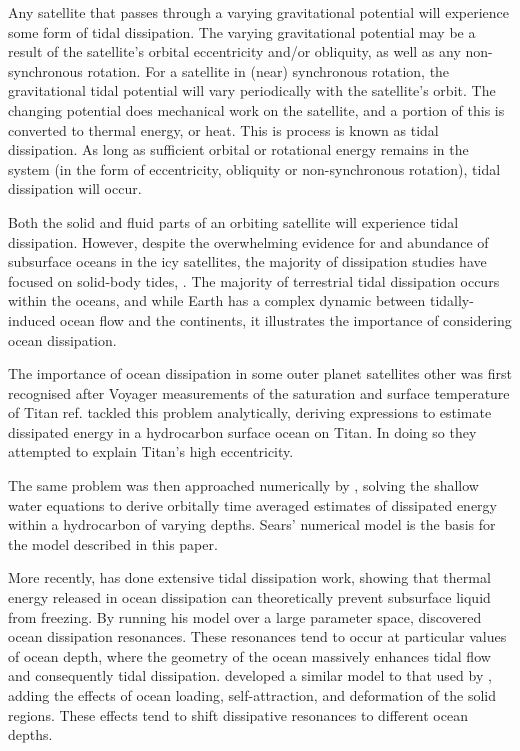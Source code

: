 Any satellite that passes through a varying gravitational potential will experience some form of tidal dissipation. The varying gravitational potential may be a result of the satellite's orbital eccentricity and/or obliquity, as well as any non-synchronous rotation. For a satellite in (near) synchronous rotation, the gravitational tidal potential will vary periodically with the satellite's orbit. The changing potential does mechanical work on the satellite, and a portion of this is converted to thermal energy, or heat. This is process is known as tidal dissipation. As long as sufficient orbital or rotational energy remains in the system (in the form of eccentricity, obliquity or non-synchronous rotation), tidal dissipation will occur.

Both the solid and fluid parts of an orbiting satellite will experience tidal dissipation. 
However, despite the overwhelming evidence for and abundance of subsurface oceans in the icy satellites, the majority of dissipation studies have focused on solid-body tides, \citep[e.g.,][]{moore2000tidal, tobie2005tidal,roberts2008tidal, beuthe2013spatial}.
The majority of terrestrial tidal dissipation occurs within the oceans, and while Earth has a complex dynamic between tidally-induced ocean flow and the continents, it illustrates the importance of considering ocean dissipation.

The importance of ocean dissipation in some outer planet satellites other was first recognised after Voyager measurements of the saturation and surface temperature of Titan {ref}. \citet{sagan1982tide} tackled this problem analytically, deriving expressions to estimate dissipated energy in a hydrocarbon surface ocean on Titan. In doing so they attempted to explain Titan's high eccentricity.

The same problem was then approached numerically by \citet{sears1995tidal}, solving the shallow water equations to derive orbitally time averaged estimates of dissipated energy within a hydrocarbon of varying depths. Sears' numerical model is the basis for the model described in this paper. 

More recently, \citet{tyler2008strong,tyler2009ocean,tyler2011tidal,tyler2014comparative} has done extensive tidal dissipation work, showing that thermal energy released in ocean dissipation can theoretically prevent subsurface liquid from freezing. By running his model over a large parameter space, \citet{tyler2011tidal} discovered ocean dissipation resonances. These resonances tend to occur at particular values of ocean depth, where the geometry of the ocean massively enhances tidal flow and consequently tidal dissipation. \citet{matsuyama2014tidal} developed a similar model to that used by \citet{tyler2011tidal}, adding the effects of ocean loading, self-attraction, and deformation of the solid regions. These effects tend to shift dissipative resonances to different ocean depths.

